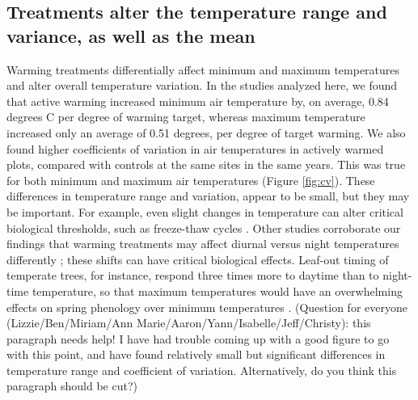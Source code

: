 \documentclass{article}
\begin{document}
\subsection* {Treatments alter the temperature range and variance, as well as the mean}
Warming treatments differentially affect minimum and maximum temperatures  and  alter overall temperature variation. In the studies analyzed here, we found that active warming increased minimum air temperature by, on average, 0.84 degrees C per degree of warming target, whereas maximum temperature increased only an average of  0.51 degrees, per degree of target warming. We also found higher coefficients of variation in air temperatures in actively warmed plots, compared with controls at the same sites in the same years. This was true for both minimum and maximum air temperatures (Figure \ref{fig:cv}). These differences in temperature range and variation, appear to be small, but they may be important. For example, even slight changes in temperature can alter critical biological thresholds, such as freeze-thaw cycles \citep{mcdaniel2014}. Other studies corroborate our findings that warming treatments may affect diurnal versus night temperatures differently \citep{shen2016,matthews2016}; these shifts can have critical biological effects. Leaf-out timing of temperate trees, for instance, respond three times more to daytime than to night- time temperature, so that maximum temperatures would have an overwhelming effects on spring phenology over minimum temperatures \citep{fu2016, piao2015}.  (Question for everyone (Lizzie/Ben/Miriam/Ann Marie/Aaron/Yann/Isabelle/Jeff/Christy): this paragraph needs help! I have had trouble coming up with a good figure to go with this point, and have found relatively small but significant differences in temperature range and coefficient of variation. Alternatively, do you think this paragraph should be cut?) 
\end{document}
